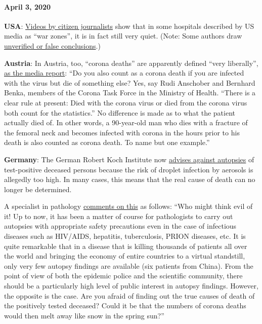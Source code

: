 \hypertarget{april-3-2020}{%
\paragraph{April 3, 2020}\label{april-3-2020}}

\textbf{USA}: \href{https://www.youtube.com/watch?v=5pIMD1enwd4}{Videos
by citizen journalists} show that in some hospitals described by US
media as ``war zones'', it is in fact still very quiet. (Note: Some
authors draw
\href{https://www.politifact.com/factchecks/2020/apr/03/facebook-posts/hospital-beds-being-kept-empty-prepare-covid-influ/}{unverified
or false conclusions}.)

\textbf{Austria}: In Austria, too, ``corona deaths'' are apparently
defined ``very liberally'',
\href{https://www.heute.at/s/osterreich-bei-corona-todesstatistik-sehr-liberal-48665863}{as
the media report}: ``Do you also count as a corona death if you are
infected with the virus but die of something else? Yes, say Rudi
Anschober and Bernhard Benka, members of the Corona Task Force in the
Ministry of Health. ``There is a clear rule at present: Died with the
corona virus or died from the corona virus both count for the
statistics.'' No difference is made as to what the patient actually died
of. In other words, a 90-year-old man who dies with a fracture of the
femoral neck and becomes infected with corona in the hours prior to his
death is also counted as corona death. To name but one example.''

\textbf{Germany}: The German Robert Koch Institute now
\href{https://www.youtube.com/watch?v=gSn_YaOYYcY}{advises against
autopsies} of test-positive deceased persons because the risk of droplet
infection by aerosols is allegedly too high. In many cases, this means
that the real cause of death can no longer be determined.

A specialist in pathology
\href{https://www.youtube.com/watch?v=gSn_YaOYYcY}{comments on this} as
follows: ``Who might think evil of it! Up to now, it has been a matter
of course for pathologists to carry out autopsies with appropriate
safety precautions even in the case of infectious diseases such as
HIV/AIDS, hepatitis, tuberculosis, PRION diseases, etc. It is quite
remarkable that in a disease that is killing thousands of patients all
over the world and bringing the economy of entire countries to a virtual
standstill, only very few autopsy findings are available (six patients
from China). From the point of view of both the epidemic police and the
scientific community, there should be a particularly high level of
public interest in autopsy findings. However, the opposite is the case.
Are you afraid of finding out the true causes of death of the positively
tested deceased? Could it be that the numbers of corona deaths would
then melt away like snow in the spring sun?''

